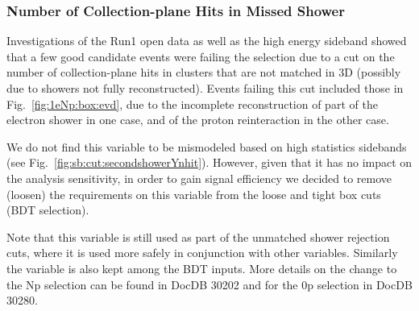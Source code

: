 \subsubsection{Number of Collection-plane Hits in Missed Shower}
\label{sec:sideband:newcuts:nhits}
Investigations of the Run1 open data as well as the \npsel high energy sideband showed that a few good candidate \nuecc events were failing the selection due to a cut on the number of collection-plane hits in clusters that are not matched in 3D (possibly due to showers not fully reconstructed). Events failing this cut included those in Fig.~\ref{fig:1eNp:box:evd}, due to the incomplete reconstruction of part of the electron shower in one case, and of the proton reinteraction in the other case.

We do not find this variable to be mismodeled based on high statistics sidebands (see Fig.~\ref{fig:sb:cut:secondshowerYnhit}). However, given that it has no impact on the analysis sensitivity, in order to gain signal efficiency we decided to remove (loosen) the requirements on this variable from the \npsel loose and tight box cuts (\zpsel BDT selection). 

Note that this variable is still used as part of the unmatched shower rejection cuts, where it is used more safely in conjunction with other variables. Similarly the variable is also kept among the BDT inputs. More details on the change to the Np selection can be found in DocDB 30202 and for the 0p selection in DocDB 30280.

